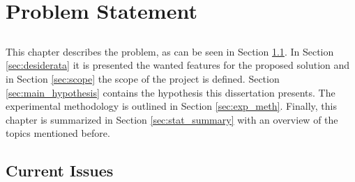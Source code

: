 \chapter{Problem Statement} \label{chap:problem_statement}

\section*{}

\minitoc \mtcskip \noindent
This chapter describes the problem, as can be seen in Section \ref{sec:current_issues}. In Section \ref{sec:desiderata} it is presented the wanted features for the proposed solution and in Section \ref{sec:scope} the scope of the project is defined. Section \ref{sec:main_hypothesis} contains the hypothesis this dissertation presents. The experimental methodology is outlined in Section \ref{sec:exp_meth}. Finally, this chapter is summarized in Section \ref{sec:stat_summary} with an overview of the topics mentioned before.

\section{Current Issues}\label{sec:current_issues}


